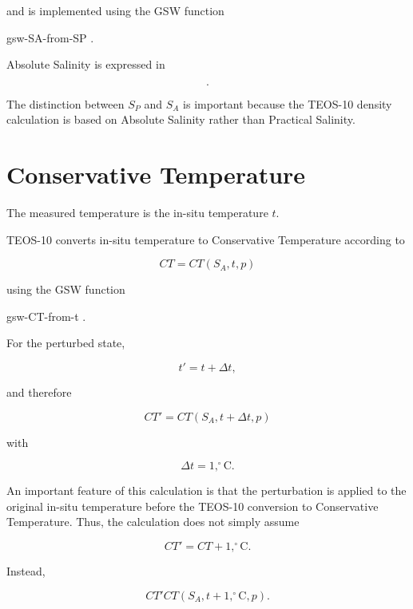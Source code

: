 \documentclass[11pt]{article}
\begin{document}
and is implemented using the GSW function

gsw-SA-from-SP
.

Absolute Salinity is expressed in

\begin{equation}
[\mathrm{g,kg^{-1}}].
\end{equation}

The distinction between $S_P$ and $S_A$ is important because the
TEOS-10 density calculation is based on Absolute Salinity rather than
Practical Salinity.

\section{Conservative Temperature}

The measured temperature is the in-situ temperature $t$.

TEOS-10 converts in-situ temperature to Conservative Temperature
according to

\begin{equation}
\boxed{
CT=CT(S_A,t,p)
}
\end{equation}

using the GSW function

gsw-CT-from-t
.

For the perturbed state,

\begin{equation}
t'=t+\Delta t,
\end{equation}

and therefore

\begin{equation}
\boxed{
CT'=CT(S_A,t+\Delta t,p)
}
\end{equation}

with

\begin{equation}
\Delta t=1,^\circ\mathrm{C}.
\end{equation}

An important feature of this calculation is that the perturbation is
applied to the original in-situ temperature before the TEOS-10
conversion to Conservative Temperature. Thus, the calculation does
not simply assume

\begin{equation}
CT'=CT+1,^\circ\mathrm{C}.
\end{equation}

Instead,

\begin{equation}
CT'
CT(S_A,t+1,^\circ\mathrm{C},p).
\end{equation}
\end{document}
